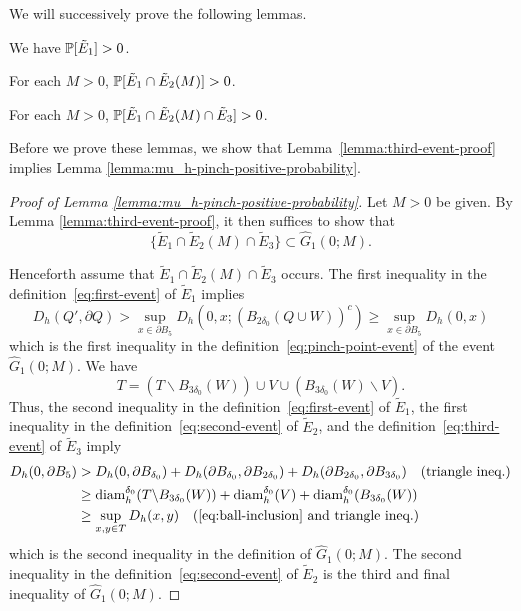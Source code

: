 \documentclass[12pt]{amsart}
\numberwithin{equation}{section}
\begin{document}
	We will successively prove the following lemmas. 
	
	\begin{lemma} \label{lemma:first-event-proof}
		We have $\P[\tilde E_1] > 0$. 
	\end{lemma}
	
	\begin{lemma} \label{lemma:second-event-proof}
		For each $M  > 0$, $\P[\tilde E_1 \cap \tilde E_2(M)] > 0$. 
	\end{lemma}
	
	\begin{lemma} \label{lemma:third-event-proof}
		For each $M  > 0$, $\P[\tilde E_1 \cap \tilde E_2(M) \cap \tilde E_3] > 0$. 
	\end{lemma}
	
	Before we prove these lemmas, we show that Lemma~\ref{lemma:third-event-proof} implies Lemma \ref{lemma:mu_h-pinch-positive-probability}.
	
	\begin{proof}[Proof of Lemma \ref{lemma:mu_h-pinch-positive-probability}]
		Let $M > 0$ be given.
		By Lemma \ref{lemma:third-event-proof}, 
		it then suffices to show that 
		\begin{equation} \label{eq:events-inclusion}
		\{\tilde E_1 \cap \tilde E_2(M) \cap \tilde E_3\} \subset \hat G_1(0; M).
		\end{equation}
		
		Henceforth assume that $\tilde E_1\cap \tilde E_2(M) \cap \tilde E_3$ occurs.
		The first inequality in the definition~\eqref{eq:first-event} of $\tilde E_1$ implies
		\[
		D_h(Q', \partial Q) > \sup_{x \in \partial B_{5}} D_h(0, x; (B_{2 \delta_0}(Q \cup W))^c) \geq \sup_{x \in \partial B_{5}} D_h(0, x)
		\]
		which is the first inequality in the definition~\eqref{eq:pinch-point-event} of the event $\hat G_1(0; M)$.
		We have
		\begin{equation} \label{eq:ball-inclusion}
		T = (T \backslash B_{3 \delta_0}(W)) \cup V \cup  (B_{3 \delta_0}(W) \backslash V).
		\end{equation}
		Thus, the second inequality in the definition~\eqref{eq:first-event} of  $\tilde E_1$, the first inequality in the definition~\eqref{eq:second-event} of $\tilde E_2$, and the definition~\eqref{eq:third-event} of $\tilde E_3$ imply 
		\begin{align*}
		D_h(0, \partial B_{5}) &> D_h(0, \partial B_{\delta_0}) + D_h(\partial B_{\delta_0}, \partial B_{2 \delta_0})
		+ D_h(\partial B_{2 \delta_0}, \partial B_{3 \delta_0}) \quad \text{(triangle ineq.)}
		\\
		&\geq \diam^{\delta_0}_h(T \backslash B_{3 \delta_0}(W))
		+  \diam^{\delta_0}_h(V)
		+  \diam^{\delta_0}_h(B_{3 \delta_0}(W)) 
		\\ 
		&\geq \sup_{x, y \in T} D_h(x,y) \quad \mbox{(\eqref{eq:ball-inclusion} and triangle ineq.)} 
		\end{align*}
		which is the second inequality in the definition of $\hat G_1(0; M)$. The second inequality in the definition~\eqref{eq:second-event} of $\tilde E_2$ is the third and final inequality of $\hat G_1(0; M)$. 
	\end{proof}
	
\end{document}

